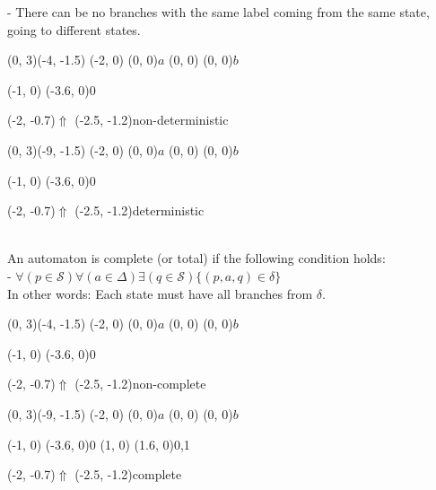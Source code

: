 \documentclass{article}
\begin{document}
- There can be no branches with the same label coming from the same state, 
  going to different states.\\
\begin{graph}(0, 3)(-4, -1.5)
  (-2, 0) (0, 0){$a$}
  (0, 0) (0, 0){$b$}

  (-1, 0) \freetext(-3.6, 0){0}
   

  \freetext(-2, -0.7){$\Uparrow$}
  \freetext(-2.5, -1.2){non-deterministic}
\end{graph}
\begin{graph}(0, 3)(-9, -1.5)
  (-2, 0) (0, 0){$a$}
  (0, 0) (0, 0){$b$}

  (-1, 0) \freetext(-3.6, 0){0}
   

  \freetext(-2, -0.7){$\Uparrow$}
  \freetext(-2.5, -1.2){deterministic}
\end{graph}
\\
An automaton is complete (or total) if the following condition holds:\\
- $\forall (p \in \mathcal{S}) \forall (a \in \Delta) 
\exists (q \in \mathcal{S}) \{(p, a, q) \in \delta\}$\\
In other words: Each state must have all branches from $\delta$.\\
\begin{graph}(0, 3)(-4, -1.5)
  (-2, 0) (0, 0){$a$}
  (0, 0) (0, 0){$b$}

  (-1, 0) \freetext(-3.6, 0){0}
   

  \freetext(-2, -0.7){$\Uparrow$}
  \freetext(-2.5, -1.2){non-complete}
\end{graph}
\begin{graph}(0, 3)(-9, -1.5)
  (-2, 0) (0, 0){$a$}
  (0, 0) (0, 0){$b$}

  (-1, 0) \freetext(-3.6, 0){0}
  (1, 0) \freetext(1.6, 0){0,1}
   

  \freetext(-2, -0.7){$\Uparrow$}
  \freetext(-2.5, -1.2){complete}
\end{graph}
\end{document}
